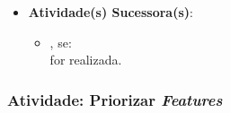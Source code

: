 \begin{itemize}
{\begin{itemize}
							\item{.}
						\end{itemize}}
					\item{\textbf{Atividade(s) Sucessora(s)}:
						\begin{itemize}
							\item{, se:
							\\  for realizada.}
						\end{itemize}}
				\end{itemize}

			\subsubsection[Atividade: Priorizar \emph{Features}]{Atividade: Priorizar \emph{Features}}
			\label{subsubsec:processo_atividade_programa_priorizar_feature}
